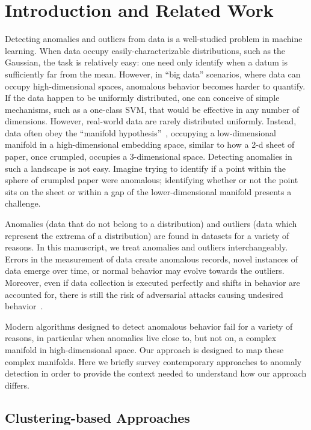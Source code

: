 \section{Introduction and Related Work}
\label{sec:introduction}

Detecting anomalies and outliers from data is a well-studied problem in machine learning.
When data occupy easily-characterizable distributions, such as the Gaussian, the task is relatively easy:
one need only identify when a datum is sufficiently far from the mean.
However, in ``big data'' scenarios, where data can occupy high-dimensional spaces, anomalous behavior becomes harder to quantify.
If the data happen to be uniformly distributed, one can conceive of simple mechanisms, such as a one-class SVM, that would be effective in any number of dimensions.
However, real-world data are rarely distributed uniformly.
Instead, data often obey the ``manifold hypothesis''~\cite{fefferman2016testing}, occupying a low-dimensional manifold in a high-dimensional embedding space, similar to how a 2-d sheet of paper, once crumpled, occupies a 3-dimensional space.
Detecting anomalies in such a landscape is not easy.
Imagine trying to identify if a point within the sphere of crumpled paper were anomalous; identifying whether or not the point sits on the sheet or within a gap of the lower-dimensional manifold presents a challenge.

Anomalies (data that do not belong to a distribution) and outliers (data which represent the extrema of a distribution) are found in datasets for a variety of reasons.
In this manuscript, we treat anomalies and outliers interchangeably.
Errors in the measurement of data create anomalous records,
novel instances of data emerge over time,
or normal behavior may evolve towards the outliers.
Moreover, even if data collection is executed perfectly and shifts in behavior are accounted for, there is still the risk of adversarial attacks causing undesired behavior~\cite{elsayed2018adversarial}.

Modern algorithms designed to detect anomalous behavior fail for a variety of reasons, in particular when anomalies live close to, but not on, a complex manifold in high-dimensional space.
Our approach is designed to map these complex manifolds.
Here we briefly survey contemporary approaches to anomaly detection in order to provide the context needed to understand how our approach differs.


\subsection{Clustering-based Approaches}
\label{subsec:introduction:clustering-based-approaches}

